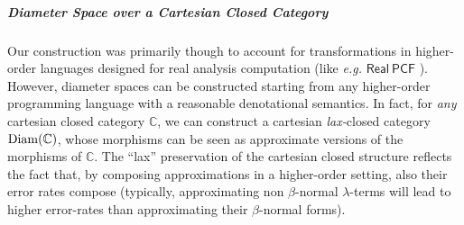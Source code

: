%
%
%
%
%
%
%
%
%
% 
%
%
%
%
%
%
%





%
\subparagraph*{Diameter Space over a Cartesian Closed Category}




Our construction was primarily though to account for transformations in higher-order languages designed for real analysis computation (like \emph{e.g.} $\mathsf{Real\ PCF}$ \cite{Edalat:2000aa}). However, diameter spaces can be constructed starting from any higher-order programming language with a reasonable denotational semantics. In fact, for \emph{any} cartesian closed category $\mathbb C$, we can construct a cartesian \emph{lax-}closed category $\operatorname{Diam}(\mathbb C)$, whose morphisms can be seen as approximate versions  of the morphisms of $\mathbb C$. The ``lax'' preservation of the cartesian closed structure reflects the fact that, by composing approximations in a higher-order setting, also their error rates compose (typically, approximating non $\beta$-normal $\lambda$-terms will lead to higher error-rates than approximating their $\beta$-normal forms). 



